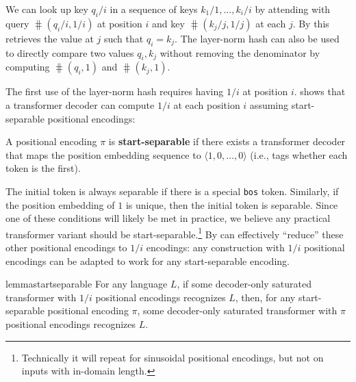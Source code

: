 
We can look up key $q_i/i$ in a sequence of keys $k_1/1, \ldots, k_i/i$ by attending with query $\hash(q_i/i, 1/i)$ at position $i$ and key $\hash(k_j/j, 1/j)$ at each $j$.
By  this retrieves the value at $j$ such that $q_i = k_j$.
The layer-norm hash can also be used to directly compare two values $q_i, k_j$ without removing the denominator by computing $\hash(q_i, 1)$ and $\hash(k_j, 1)$.

The first use of the layer-norm hash requires having $1/i$ at position $i$.  shows that a transformer decoder can compute $1/i$ at each position $i$ assuming start-separable positional encodings:

\begin{definition}
    A positional encoding $\pi$ is \textbf{start-separable} if there exists a transformer decoder that maps the position embedding sequence to $\langle 1, 0, \ldots, 0 \rangle$ (i.e., tags whether each token is the first).
\end{definition}

The initial token is always separable if there is a special \texttt{bos} token. Similarly, if the position embedding of $1$ is unique, then the initial token is separable. Since one of these conditions will likely be met in practice, we believe any practical transformer variant should be start-separable.\footnote{Technically it will repeat for sinusoidal positional encodings, but not on inputs with in-domain length.} By  can effectively ``reduce'' these other positional encodings to $1/i$ encodings: any construction with $1/i$ positional encodings can be adapted to work for any start-separable encoding.

\begin{restatable}{lemma}{startseparable} \label{lem:start-separable}
    For any language $L$,
    if some decoder-only saturated transformer with $1/i$ positional encodings recognizes $L$, then,
    for any start-separable positional encoding $\pi$, some decoder-only saturated transformer with $\pi$ positional encodings recognizes $L$.
\end{restatable}

